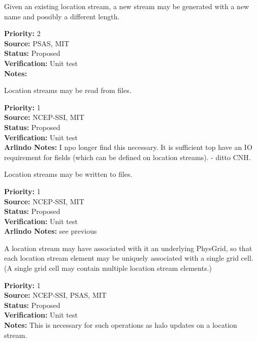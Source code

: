 Given an existing location stream, a new stream may be generated with a new name and
possibly a different length.
\begin{reqlist}
{\bf Priority:} 2 \\
{\bf Source:} PSAS, MIT\\
{\bf Status:} Proposed \\
{\bf Verification:} Unit test \\
{\bf Notes:} 
\end{reqlist}

Location streams may be read from files.
\begin{reqlist}
{\bf Priority:} 1 \\
{\bf Source:} NCEP-SSI, MIT \\
{\bf Status:} Proposed \\
{\bf Verification:} Unit test \\
{\bf Arlindo Notes:} I npo longer find this necessary. It is sufficient top have an IO requirement for fields (which can be defined on location streams). - ditto CNH.
\end{reqlist}

Location streams may be written to files.
\begin{reqlist}
{\bf Priority:} 1 \\
{\bf Source:} NCEP-SSI, MIT \\
{\bf Status:} Proposed \\
{\bf Verification:} Unit test \\
{\bf Arlindo Notes:} see previous 
\end{reqlist}

A location stream may have associated with it an underlying PhysGrid, so that each
location stream element may be uniquely associated with a single grid cell. (A single
grid cell may contain multiple location stream elements.)
\begin{reqlist}
{\bf Priority:} 1 \\
{\bf Source:} NCEP-SSI, PSAS, MIT \\
{\bf Status:} Proposed \\
{\bf Verification:} Unit test \\
{\bf Notes:} This is necessary for such operations as halo updates on a location
stream.
\end{reqlist}


